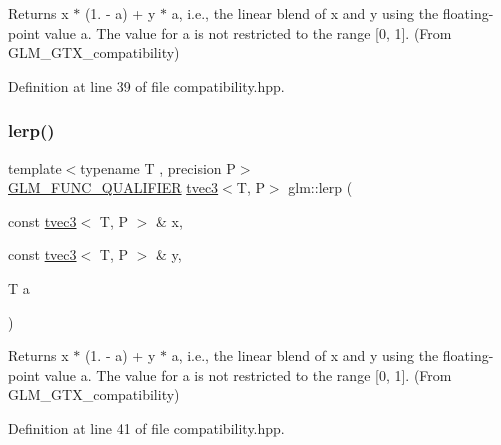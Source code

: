 Returns x $\ast$ (1. -\/ a) + y $\ast$ a, i.\+e., the linear blend of x and y using the floating-\/point value a. The value for a is not restricted to the range \mbox{[}0, 1\mbox{]}. (From G\+L\+M\+\_\+\+G\+T\+X\+\_\+compatibility) 



Definition at line 39 of file compatibility.\+hpp.

\mbox{\label{group__gtx__compatibility_gaf4c885ac72b8879b05777cb516c555c9}} 
\subsubsection{\texorpdfstring{lerp()}{lerp()}\hspace{0.1cm}{\footnotesize\ttfamily [3/7]}}
{\footnotesize\ttfamily template$<$typename T , precision P$>$ \\
\mbox{\hyperlink{setup_8hpp_a33fdea6f91c5f834105f7415e2a64407}{G\+L\+M\+\_\+\+F\+U\+N\+C\+\_\+\+Q\+U\+A\+L\+I\+F\+I\+ER}} \mbox{\hyperlink{structglm_1_1tvec3}{tvec3}}$<$T, P$>$ glm\+::lerp (\begin{DoxyParamCaption}\item[{const \mbox{\hyperlink{structglm_1_1tvec3}{tvec3}}$<$ T, P $>$ \&}]{x,  }\item[{const \mbox{\hyperlink{structglm_1_1tvec3}{tvec3}}$<$ T, P $>$ \&}]{y,  }\item[{T}]{a }\end{DoxyParamCaption})}



Returns x $\ast$ (1. -\/ a) + y $\ast$ a, i.\+e., the linear blend of x and y using the floating-\/point value a. The value for a is not restricted to the range \mbox{[}0, 1\mbox{]}. (From G\+L\+M\+\_\+\+G\+T\+X\+\_\+compatibility) 



Definition at line 41 of file compatibility.\+hpp.

\mbox{\label{group__gtx__compatibility_ga363d5d069d31a6c2cdd1e9589dde4a60}} 
